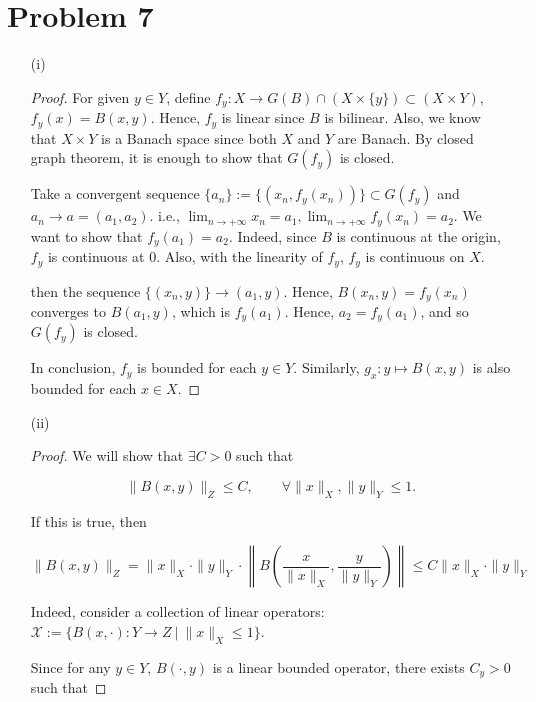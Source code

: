 \documentclass[12pt]{article}
\begin{document}
\section*{Problem 7}

\begin{enumerate}

\item [(i)]

\begin{proof}

For given $y\in Y$, define $f_y: X \rightarrow G(B)\cap (X\times\{y\}) \subset (X\times Y)$, $f_y(x) = B(x, y)$. Hence, $f_y$ is linear since $B$ is bilinear. Also, we know that $X\times Y$ is a Banach space since both $X$ and $Y$ are Banach. By closed graph theorem, it is enough to show that $G(f_y)$ is closed.

Take a convergent sequence $\{a_n\}:= \{(x_n, f_y(x_n))\} \subset G(f_y)$ and $a_n \rightarrow a = (a_1, a_2)$. i.e., $\lim_{n\rightarrow +\infty} x_n = a_1, \lim_{n\rightarrow +\infty} f_y(x_n) = a_2$. We want to show that $f_y(a_1) = a_2$. Indeed, since $B$ is continuous at the origin, $f_y$ is continuous at $0$. Also, with the linearity of $f_y$, $f_y$ is continuous on $X$.

then the sequence $\{(x_n, y)\}\rightarrow (a_1, y)$. Hence, $B(x_n, y) = f_y(x_n)$ converges to $B(a_1, y)$, which is $f_y(a_1)$. Hence, $a_2 = f_y(a_1)$, and so $G(f_y)$ is closed.

In conclusion, $f_y$ is bounded for each $y\in Y$. Similarly, $g_x: y \mapsto B(x, y)$ is also bounded for each $x \in X$.

\end{proof}

\item[(ii)]

\begin{proof}

We will show that $\exists C > 0$ such that 

$$
\|B(x, y)\|_Z \leqslant C, \qquad \forall \|x\|_X, \|y\|_Y \leqslant1.
$$

If this is true, then 

$$
\|B(x, y)\|_Z = \|x\|_X\cdot\|y\|_Y\cdot \left\|B(\frac{x}{\|x\|_X}, \frac{y}{\|y\|_Y})\right\| \leqslant C \|x\|_X\cdot\|y\|_Y
$$

Indeed, consider a collection of linear operators: $\mathcal X := \{B(x, \cdot): Y\rightarrow Z \ | \ \|x\|_X \leqslant 1 \}$.

Since for any $y\in Y$, $B(\cdot, y)$ is a linear bounded operator, there exists $C_y >0$ such that 


\end{proof}
\end{enumerate}
\end{document}
